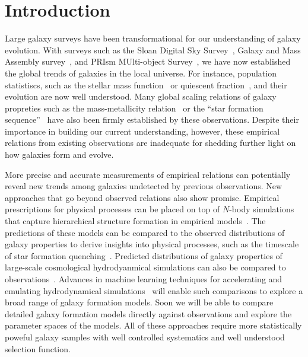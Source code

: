 \section{Introduction} \label{sec:intro} 
Large galaxy surveys have been transformational for our understanding of galaxy
evolution. 
With surveys such as the Sloan Digital Sky Survey~\citep[SDSS;][]{york2000},
Galaxy and Mass Assembly survey~\citep[GAMA;][]{driver2011}, and 
PRIsm MUlti-object Survey~\citep[PRIMUS;][]{coil2011}, 
we have now established the global trends of galaxies in the local universe. 
For instance, population statistiscs, such as the stellar mass
function~\citep{li2009, marchesini2009, moustakas2013} or quiescent
fraction~\citep{kauffmann2003a, blanton2003, baldry2006, taylor2009}, and their
evolution are now well understood. 
Many global scaling relations of galaxy propreties such as the mass-metallicity
relation~\citep{tremonti2004} or
the ``star formation sequence''~\citep{noeske2007, daddi2007, salim2007} have
also been firmly established by these observations. 
Despite their importance in building our current understanding, however,
these empirical relations from existing observations are inadequate for
shedding further light on how galaxies form and evolve.

More precise and accurate measurements of empirical relations can potentially
reveal new trends among galaxies undetected by previous observations.
New approaches that go beyond observed relations also show promise.
Empirical prescriptions for physical processes can be placed on top of $N$-body
simulations that capture hierarchical structure formation in empirical 
models~\citep[\emph{e.g.} {\sc UniverseMachine}][]{behroozi2019}. 
The predictions of these models can be compared to the observed distributions
of galaxy properties to derive insights into physical processes, such as the
timescale of star formation quenching~\citep{wetzel2013, hahn2017, tinker2017}. 
Predicted distributions of galaxy properties of large-scale cosmological 
hydrodyanmical simulations can also be compared to 
observations~\citep[\emph{e.g.}][]{genel2014, somerville2015a, dave2017a,
trayford2017, dickey2021, donnari2021}.
Advances in machine learning techniques for accelerating and emulating
hydrodynamical simulations~\citep{villaescusa-navarro2021} will enable such
comparisons to explore a broad range of galaxy formation models.
Soon we will be able to compare detailed galaxy formation models directly
against observations and explore the parameter spaces of the models. 
All of these approaches require more statistically poweful galaxy samples with
well controlled systematics and well understood selection function. 

